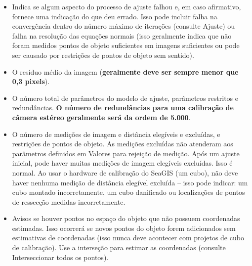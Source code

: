 \documentclass[
  12pt,
  letterpaper,
  DIV=11,
  numbers=noendperiod]{scrreprt}
\providecommand{\tightlist}{%
  \setlength{\itemsep}{0pt}\setlength{\parskip}{0pt}}
\begin{document}
\begin{itemize}
\tightlist
\item
  Indica se algum aspecto do processo de ajuste falhou e, em caso
  afirmativo, fornece uma indicação do que deu errado. Isso pode incluir
  falha na convergência dentro do número máximo de iterações (consulte
  Ajuste) ou falha na resolução das equações normais (isso geralmente
  indica que não foram medidos pontos de objeto suficientes em imagens
  suficientes ou pode ser causado por restrições de pontos de objeto sem
  sentido).
\end{itemize}

\begin{itemize}
\tightlist
\item
  O resíduo médio da imagem (\textbf{geralmente deve ser sempre menor
  que 0,3 pixels}).
\end{itemize}

\begin{itemize}
\tightlist
\item
  O número total de parâmetros do modelo de ajuste, parâmetros restritos
  e redundâncias. \textbf{O número de redundâncias para uma calibração
  de câmera estéreo geralmente será da ordem de 5.000}.
\end{itemize}

\begin{itemize}
\tightlist
\item
  O número de medições de imagem e distância elegíveis e excluídas, e
  restrições de pontos de objeto. As medições excluídas não atenderam
  aos parâmetros definidos em Valores para rejeição de medição. Após um
  ajuste inicial, pode haver muitas medições de imagem elegíveis
  excluídas. Isso é normal. Ao usar o hardware de calibração do SeaGIS
  (um cubo), não deve haver nenhuma medição de distância elegível
  excluída -- isso pode indicar: um cubo montado incorretamente, um cubo
  danificado ou localizações de pontos de ressecção medidas
  incorretamente.
\end{itemize}

\begin{itemize}
\tightlist
\item
  Avisos se houver pontos no espaço do objeto que não possuem
  coordenadas estimadas. Isso ocorrerá se novos pontos do objeto forem
  adicionados sem estimativas de coordenadas (isso nunca deve acontecer
  com projetos de cubo de calibração). Use a interseção para estimar as
  coordenadas (consulte Interseccionar todos os pontos).
\end{itemize}
\end{document}
